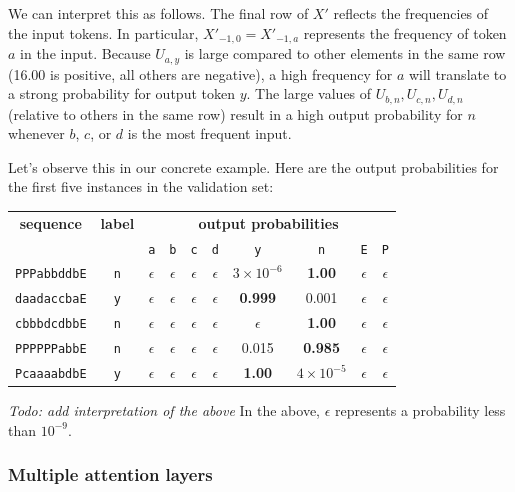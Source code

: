 \documentclass{article}
\newcommand{\todo}[1]{\emph{Todo: #1}}
\begin{document}
We can interpret this as follows. The final row of $X'$ reflects the frequencies of the input tokens. In particular, $X'_{-1,0}=X'_{-1,a}$ represents the frequency of token $a$ in the input. Because $U_{a,y}$ is large compared to other elements in the same row (16.00 is positive, all others are negative), a high frequency for $a$ will translate to a strong probability for output token $y$. The large values of $U_{b,n},U_{c,n},U_{d,n}$ (relative to others in the same row) result in a high output probability for $n$ whenever $b$, $c$, or $d$ is the most frequent input.

Let's observe this in our concrete example. Here are the output probabilities for the first five instances in the validation set:
\begin{center}
\begin{tabular}{cccccccccc}
  \textbf{sequence} & \textbf{label} & \multicolumn{8}{c}{\textbf{output probabilities}} \\
  & & \texttt{a} & \texttt{b} & \texttt{c} & \texttt{d} & \texttt{y} & \texttt{n} & \texttt{E} & \texttt{P} \\
\texttt{PPPabbddbE} & \texttt{n} & $\epsilon$ & $\epsilon$ & $\epsilon$ & $\epsilon$ & $3\times 10^{-6}$ & \textbf{1.00} & $\epsilon$ & $\epsilon$ \\
\texttt{daadaccbaE} & \texttt{y} & $\epsilon$ & $\epsilon$ & $\epsilon$ & $\epsilon$ & \textbf{0.999} & 0.001 & $\epsilon$ & $\epsilon$ \\
\texttt{cbbbdcdbbE} & \texttt{n} & $\epsilon$ & $\epsilon$ & $\epsilon$ & $\epsilon$ & $\epsilon$ & \textbf{1.00} & $\epsilon$ & $\epsilon$ \\
\texttt{PPPPPPabbE} & \texttt{n} & $\epsilon$ & $\epsilon$ & $\epsilon$ & $\epsilon$ & 0.015 & \textbf{0.985} & $\epsilon$ & $\epsilon$ \\
\texttt{PcaaaabdbE} & \texttt{y} & $\epsilon$ & $\epsilon$ & $\epsilon$ & $\epsilon$ & \textbf{1.00} & $4\times 10^{-5}$ & $\epsilon$ & $\epsilon$ \\
\end{tabular}
\end{center}
\todo{add interpretation of the above}
In the above, $\epsilon$ represents a probability less than $10^{-9}$.

\subsubsection*{Multiple attention layers}
\end{document}
